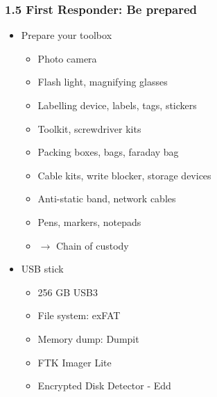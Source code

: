 \begin{frame}
  \frametitle{1.5 First Responder: Be prepared}
  \begin{itemize}
      \item Prepare your toolbox
      \begin{itemize}
          \item Photo camera
          \item Flash light, magnifying glasses
          \item Labelling device, labels, tags, stickers
          \item Toolkit, screwdriver kits
          \item Packing boxes, bags, faraday bag
          \item Cable kits, write blocker, storage devices
          \item Anti-static band, network cables
          \item Pens, markers, notepads
          \item[] $\to$ Chain of custody
      \end{itemize}
      \item USB stick
      \begin{itemize}
          \item 256 GB USB3
          \item File system: exFAT
          \item Memory dump: Dumpit
          \item FTK Imager Lite
          \item Encrypted Disk Detector - Edd
      \end{itemize}
  \end{itemize}
\end{frame}


